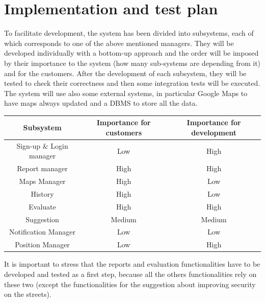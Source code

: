 \documentclass[12pt,a4paper]{report}
\begin{document}
		\section{Implementation and test plan}
			To facilitate development, the system has been divided into subsystems, each of which corresponds to one of the
			above mentioned managers. They will be developed individually with a bottom-up approach and the order will be
			imposed by their importance to the system (how many sub-systems are depending from it) and for the customers.
			After the development of each subsystem, they will be tested to check their correctness and then
			some integration tests  will be executed. The system will use also some external systems, in particular Google Maps to have maps
			always updated and a DBMS to store all the data.
			\begin{table}[H]
				\centering
				\begin{tabular}[width = \textwidth, position = center]{|c|c|c|}
					\hline
					{Subsystem} & {Importance for customers} & {Importance for development}\\
					\hline
					\hline
					Sign-up \& Login manager & Low & High\\
					\hline
					Report manager & High & High\\
					\hline
					Maps Manager & High & Low\\
					\hline
					History & High & Low\\
					\hline
					Evaluate & High & High\\
					\hline
					Suggestion & Medium & Medium\\
					\hline
					Notification Manager & Low & Low\\
					\hline
					Position Manager & Low & High\\
					\hline
				\end{tabular}
				\label{tab: }
			\end{table}
			\newpage
			It is important to stress that the reports and evaluation functionalities have to be developed and tested
			as a first step, because all the others functionalities rely on these two (except the functionalities for the suggestion
			about improving security on the streets).
\end{document}
